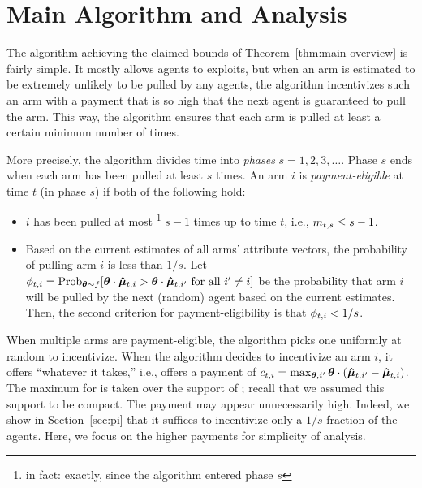\section{Main Algorithm and Analysis}
\label{sec:ub}

The algorithm achieving the claimed bounds of
Theorem~\ref{thm:main-overview} is fairly simple.
It mostly allows agents to exploits, but when an arm is estimated to
be extremely unlikely to be pulled by any agents,
the algorithm incentivizes such an arm with a payment that is so high
that the next agent is guaranteed to pull the arm.
This way, the algorithm ensures that each arm is pulled at least a
certain minimum number of times.

More precisely, the algorithm divides time into \emph{phases}
$s = 1, 2, 3, \ldots$.
Phase $s$ ends when each arm has been pulled at least $s$ times.
An arm $i$ is \emph{payment-eligible} at time $t$ (in phase $s$)
if both of the following hold:

\begin{itemize}
\item $i$ has been pulled at most%
\footnote{in fact: exactly, since the algorithm entered phase $s$}
$s-1$ times up to time $t$, i.e., $m_{t,s} \leq s-1$.
\item Based on the current estimates  of all arms'
attribute vectors, the probability of pulling arm $i$ is less than $1/s$.
Let $\PullProb{t}{i} = \Prob[\AgV \sim \AgentDist]{\AgV \cdot \ArmEV{t}{i} > \AgV
  \cdot \ArmEV{t}{i'} \mbox{ for all } i' \neq i}$
be the probability that arm $i$ will be pulled
by the next (random) agent based on the current estimates. 
Then, the second criterion for payment-eligibility is that
$\phi_{t,i} < 1/s$.
\end{itemize}

When multiple arms are payment-eligible, the algorithm picks one
uniformly at random to incentivize.
When the algorithm decides to incentivize an arm $i$,
it offers ``whatever it takes,'' i.e., offers a payment of
$c_{t,i} = \max_{\bm{\theta},i'} \bm{\theta} \cdot (\bm{\hat{\mu}}_{t,i'} - \bm{\hat{\mu}}_{t,i})$.
The maximum for \AgV is taken over the support of \AgentDist;
recall that we assumed this support to be compact.
The payment  may appear unnecessarily high.
Indeed, we show in Section~\ref{sec:pi} that it suffices to
incentivize only a $1/s$ fraction of the agents.
Here, we focus on the higher payments for simplicity of analysis.

